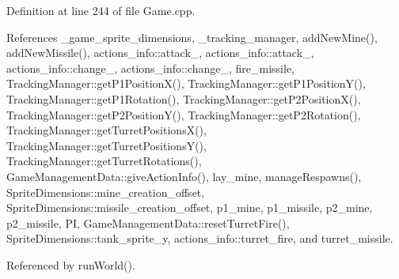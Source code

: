 Definition at line 244 of file Game.\-cpp.



References \-\_\-game\-\_\-sprite\-\_\-dimensions, \-\_\-tracking\-\_\-manager, add\-New\-Mine(), add\-New\-Missile(), actions\-\_\-info\-::attack\-\_, actions\-\_\-info\-::attack\-\_, actions\-\_\-info\-::change\-\_, actions\-\_\-info\-::change\-\_, fire\-\_\-missile, Tracking\-Manager\-::get\-P1\-Position\-X(), Tracking\-Manager\-::get\-P1\-Position\-Y(), Tracking\-Manager\-::get\-P1\-Rotation(), Tracking\-Manager\-::get\-P2\-Position\-X(), Tracking\-Manager\-::get\-P2\-Position\-Y(), Tracking\-Manager\-::get\-P2\-Rotation(), Tracking\-Manager\-::get\-Turret\-Positions\-X(), Tracking\-Manager\-::get\-Turret\-Positions\-Y(), Tracking\-Manager\-::get\-Turret\-Rotations(), Game\-Management\-Data\-::give\-Action\-Info(), lay\-\_\-mine, manage\-Respawns(), Sprite\-Dimensions\-::mine\-\_\-creation\-\_\-offset, Sprite\-Dimensions\-::missile\-\_\-creation\-\_\-offset, p1\-\_\-mine, p1\-\_\-missile, p2\-\_\-mine, p2\-\_\-missile, P\-I, Game\-Management\-Data\-::reset\-Turret\-Fire(), Sprite\-Dimensions\-::tank\-\_\-sprite\-\_\-y, actions\-\_\-info\-::turret\-\_\-fire, and turret\-\_\-missile.



Referenced by run\-World().


